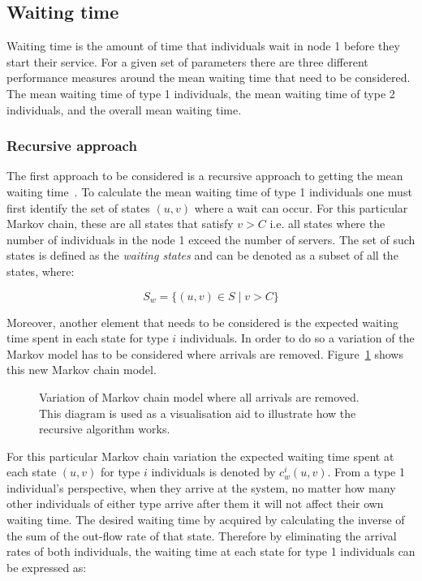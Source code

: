 \subsection{Waiting time}\label{sec:waiting_time}
Waiting time is the amount of time that individuals wait in node 1 before
they start their service.
For a given set of parameters there are three different performance measures
around the mean waiting time that need to be considered.
The mean waiting time of type 1 individuals, the mean waiting time of type 2
individuals, and the overall mean waiting time.

\subsubsection{Recursive approach}\label{sec:recursive_waiting_time}

The first approach to be considered is a recursive approach to getting the
mean waiting time~\cite{banjevic1996recursive}.
To calculate the mean waiting time of type 1 individuals one must first
identify the set of states \((u, v)\) where a wait can occur.
For this particular Markov chain, these are all states that satisfy \(v > C\)
i.e. all states where the number of individuals in the node 1 exceed
the number of servers.
The set of such states is defined as the \textit{waiting states} and can be
denoted as a subset of all the states, where:

\begin{equation} \label{eq:waiting_states}
    S_w = \{(u, v) \in S \; | \; v > C \}
\end{equation}

Moreover, another element that needs to be considered is the expected waiting
time spent in each state for type \(i\) individuals.
In order to do so a variation of the Markov model has to be considered where
arrivals are removed.
Figure~\ref{fig:markov_variation_no_arrivals} shows this new Markov chain model.

\begin{figure}[H]
    \centering
    
    \caption{Variation of Markov chain model where all arrivals are removed.
    This diagram is used as a visualisation aid to illustrate how the recursive
    algorithm works.}
    \label{fig:markov_variation_no_arrivals}
\end{figure}

For this particular Markov chain variation the expected waiting time spent at
each state \((u,v)\) for type \(i\) individuals is denoted by \(c_w^i(u,v)\).
From a type 1 individual's perspective, when they arrive at the system, no
matter how many other individuals of either type arrive after them it will not
affect their own waiting time.
The desired waiting time by acquired by calculating the inverse of the sum of
the out-flow rate of that state.
Therefore by eliminating the arrival rates of both individuals, the waiting time
at each state for type 1 individuals can be expressed as:

